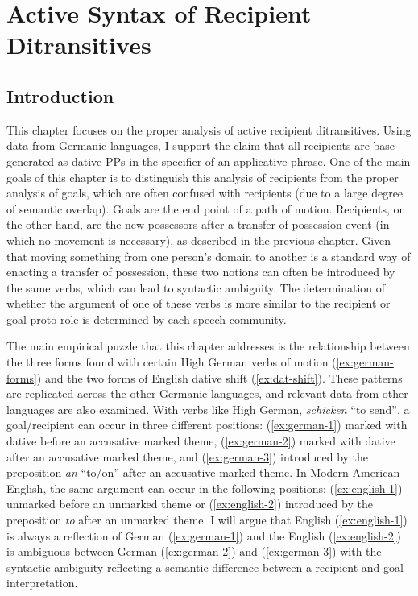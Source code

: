 \chapter{Active Syntax of Recipient Ditransitives}\label{ch:active}
\section{Introduction}
This chapter focuses on the proper analysis of active recipient ditransitives. Using data from Germanic languages, I support the claim that all recipients are base generated as dative PPs in the specifier of an applicative phrase. One of the main goals of this chapter is to distinguish this analysis of recipients from the proper analysis of goals, which are often confused with recipients (due to a large degree of semantic overlap). Goals are the end point of a path of motion. Recipients, on the other hand, are the new possessors after a transfer of possession event (in which no movement is necessary), as described in the previous chapter. Given that moving something from one person's domain to another is a standard way of enacting a transfer of possession, these two notions can often be introduced by the same verbs, which can lead to syntactic ambiguity. The determination of whether the argument of one of these verbs is more similar to the recipient or goal proto-role is determined by each speech community.

The main empirical puzzle that this chapter addresses is the relationship between the three forms found with certain High German verbs of motion (\ref{ex:german-forms}) and the two forms of English dative shift (\ref{ex:dat-shift}). These patterns are replicated across the other Germanic languages, and relevant data from other languages are also examined. With verbs like High German, \textit{schicken} ``to send'', a goal/recipient can occur in three different positions: (\ref{ex:german-1}) marked with dative before an accusative marked theme, (\ref{ex:german-2}) marked with dative after an accusative marked theme, and (\ref{ex:german-3}) introduced by the preposition \textit{an} ``to/on'' after an accusative marked theme. In Modern American English, the same argument can occur in the following positions: (\ref{ex:english-1}) unmarked before an unmarked theme or (\ref{ex:english-2}) introduced by the preposition \textit{to} after an unmarked theme. I will argue that English (\ref{ex:english-1}) is always a reflection of German (\ref{ex:german-1}) and the English (\ref{ex:english-2}) is ambiguous between German (\ref{ex:german-2}) and (\ref{ex:german-3}) with the syntactic ambiguity reflecting a semantic difference between a recipient and goal interpretation.

